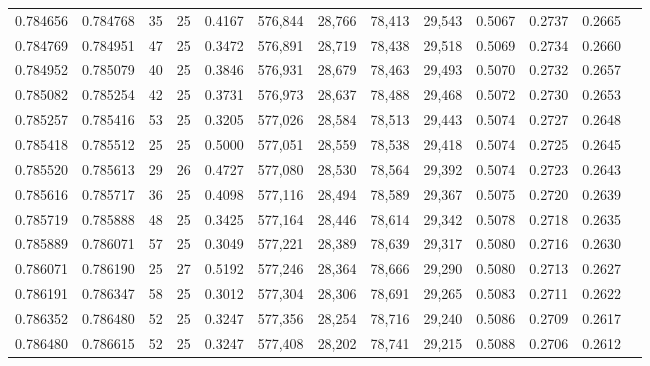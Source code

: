 \begin{tabular}{rrrrrrrrrrrrr}
0.784656 & 0.784768 &    35 &  25 &                                     0.4167 & 576,844 &  28,766 &  78,413 &  29,543 & 0.5067 & 0.2737 & 0.2665 \\
0.784769 & 0.784951 &    47 &  25 &                                     0.3472 & 576,891 &  28,719 &  78,438 &  29,518 & 0.5069 & 0.2734 & 0.2660 \\
0.784952 & 0.785079 &    40 &  25 &                                     0.3846 & 576,931 &  28,679 &  78,463 &  29,493 & 0.5070 & 0.2732 & 0.2657 \\
0.785082 & 0.785254 &    42 &  25 &                                     0.3731 & 576,973 &  28,637 &  78,488 &  29,468 & 0.5072 & 0.2730 & 0.2653 \\
0.785257 & 0.785416 &    53 &  25 &                                     0.3205 & 577,026 &  28,584 &  78,513 &  29,443 & 0.5074 & 0.2727 & 0.2648 \\
0.785418 & 0.785512 &    25 &  25 &                                     0.5000 & 577,051 &  28,559 &  78,538 &  29,418 & 0.5074 & 0.2725 & 0.2645 \\
0.785520 & 0.785613 &    29 &  26 &                                     0.4727 & 577,080 &  28,530 &  78,564 &  29,392 & 0.5074 & 0.2723 & 0.2643 \\
0.785616 & 0.785717 &    36 &  25 &                                     0.4098 & 577,116 &  28,494 &  78,589 &  29,367 & 0.5075 & 0.2720 & 0.2639 \\
0.785719 & 0.785888 &    48 &  25 &                                     0.3425 & 577,164 &  28,446 &  78,614 &  29,342 & 0.5078 & 0.2718 & 0.2635 \\
0.785889 & 0.786071 &    57 &  25 &                                     0.3049 & 577,221 &  28,389 &  78,639 &  29,317 & 0.5080 & 0.2716 & 0.2630 \\
0.786071 & 0.786190 &    25 &  27 &                                     0.5192 & 577,246 &  28,364 &  78,666 &  29,290 & 0.5080 & 0.2713 & 0.2627 \\
0.786191 & 0.786347 &    58 &  25 &                                     0.3012 & 577,304 &  28,306 &  78,691 &  29,265 & 0.5083 & 0.2711 & 0.2622 \\
0.786352 & 0.786480 &    52 &  25 &                                     0.3247 & 577,356 &  28,254 &  78,716 &  29,240 & 0.5086 & 0.2709 & 0.2617 \\
0.786480 & 0.786615 &    52 &  25 &                                     0.3247 & 577,408 &  28,202 &  78,741 &  29,215 & 0.5088 & 0.2706 & 0.2612 \\

\end{tabular}
